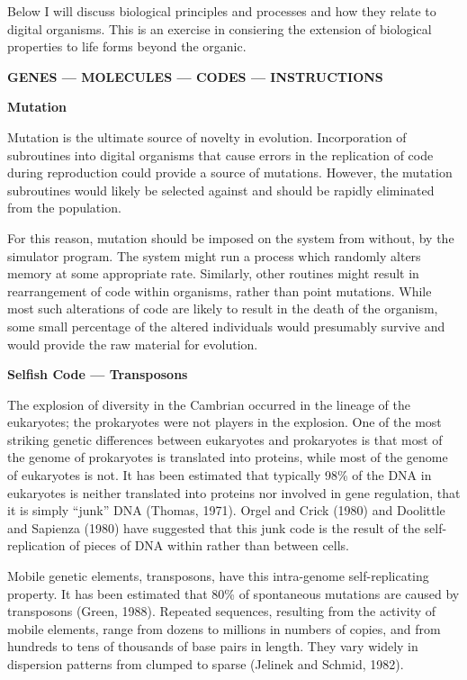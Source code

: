 Below I will discuss biological principles and processes and how they
relate to digital organisms.  This is an exercise in consiering
the extension of biological properties to life forms beyond the organic.

\LP
\bf GENES --- MOLECULES --- CODES --- INSTRUCTIONS\rm
\eLP

\LP
\bf Mutation\rm
\eLP

Mutation is the ultimate source of novelty in evolution.  Incorporation
of subroutines into digital organisms that cause errors in the
replication of code during reproduction could provide a source of mutations.
However, the mutation subroutines would likely be selected against and
should be rapidly eliminated from the population.

For this reason, mutation should be imposed on the
system from without, by the simulator program.  The system might run a
process which randomly alters memory at some appropriate rate.  Similarly,
other routines might result in rearrangement of code within organisms,
rather than point mutations.  While most such alterations of code are
likely to result in the death of the organism, some small percentage of
the altered individuals would presumably survive and would provide the
raw material for evolution.

\LP
\bf Selfish Code --- Transposons\rm
\eLP

The explosion of diversity in the Cambrian occurred in the lineage of
the eukaryotes; the prokaryotes were not players in the explosion.
One of the most striking genetic differences between eukaryotes and
prokaryotes is that most of the genome of prokaryotes is translated into
proteins, while most of the genome of eukaryotes is not.
It has been estimated that typically 98\% of the DNA in eukaryotes
is neither translated into proteins nor involved in gene regulation,
that it is simply ``junk'' DNA (Thomas, 1971).  Orgel and Crick (1980)
and Doolittle and Sapienza (1980) have suggested that this junk code is
the result of the self-replication of pieces of DNA within rather than
between cells.

Mobile genetic elements, transposons, have this intra-genome self-replicating
property.  It has been estimated that 80\% of spontaneous mutations are caused
by transposons (Green, 1988).  Repeated sequences, resulting from the activity
of mobile elements, range from dozens to millions in numbers of copies, and
from hundreds to tens of thousands of base pairs in length.  They vary
widely in dispersion patterns from clumped to sparse (Jelinek and Schmid,
1982).

